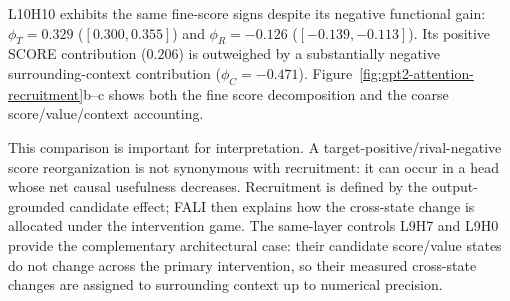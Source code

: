L10H10 exhibits the same fine-score signs despite its negative functional gain: $\phi_T=0.329$ ($[0.300,0.355]$) and $\phi_R=-0.126$ ($[-0.139,-0.113]$). Its positive SCORE contribution ($0.206$) is outweighed by a substantially negative surrounding-context contribution ($\phi_C=-0.471$). Figure~\ref{fig:gpt2-attention-recruitment}b--c shows both the fine score decomposition and the coarse score/value/context accounting.

This comparison is important for interpretation. A target-positive/rival-negative score reorganization is not synonymous with recruitment: it can occur in a head whose net causal usefulness decreases. Recruitment is defined by the output-grounded candidate effect; FALI then explains how the cross-state change is allocated under the intervention game. The same-layer controls L9H7 and L9H0 provide the complementary architectural case: their candidate score/value states do not change across the primary intervention, so their measured cross-state changes are assigned to surrounding context up to numerical precision.

